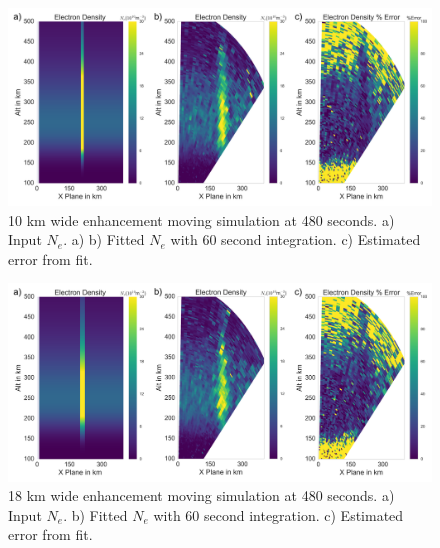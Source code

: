 \begin{figure}[!t]
\centering
\includegraphics[width=6in]{moving10kminouterr}
\caption{10 km wide enhancement moving simulation at 480 seconds. a) Input $N_e$. a)  b) Fitted $N_e$ with 60 second integration. c) Estimated error from fit.}
\label{fig:moving10all}
\end{figure}

\begin{figure}[!t]
\centering
\includegraphics[width=6in]{moving18kminouterr}
\caption{18 km wide enhancement moving simulation at 480 seconds. a) Input $N_e$.  b) Fitted $N_e$ with 60 second integration. c) Estimated error from fit.}
\label{fig:moving18all}
\end{figure}

